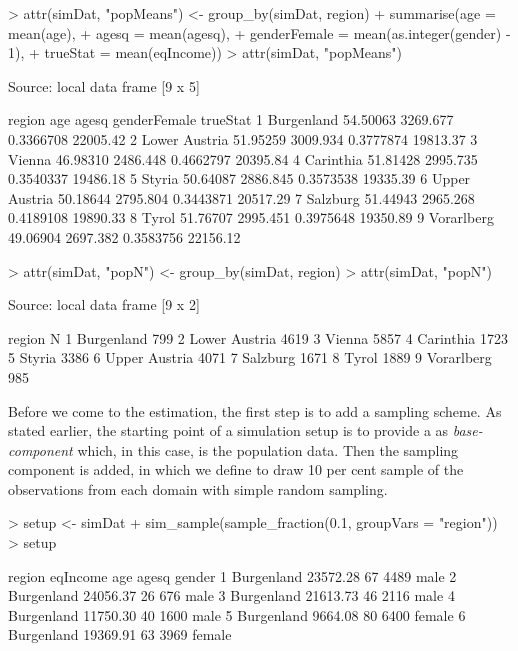 \documentclass[article]{ajs}
\begin{document}
\begin{Schunk}
\begin{Sinput}
> attr(simDat, "popMeans") <- group_by(simDat, region) %
+   summarise(age = mean(age),
+             agesq = mean(agesq),
+             genderFemale = mean(as.integer(gender) - 1),
+             trueStat = mean(eqIncome))
> attr(simDat, "popMeans")
\end{Sinput}
\begin{Soutput}
Source: local data frame [9 x 5]

         region      age    agesq genderFemale trueStat
1    Burgenland 54.50063 3269.677    0.3366708 22005.42
2 Lower Austria 51.95259 3009.934    0.3777874 19813.37
3        Vienna 46.98310 2486.448    0.4662797 20395.84
4     Carinthia 51.81428 2995.735    0.3540337 19486.18
5        Styria 50.64087 2886.845    0.3573538 19335.39
6 Upper Austria 50.18644 2795.804    0.3443871 20517.29
7      Salzburg 51.44943 2965.268    0.4189108 19890.33
8         Tyrol 51.76707 2995.451    0.3975648 19350.89
9    Vorarlberg 49.06904 2697.382    0.3583756 22156.12
\end{Soutput}
\begin{Sinput}
> attr(simDat, "popN") <- group_by(simDat, region) %
> attr(simDat, "popN")
\end{Sinput}
\begin{Soutput}
Source: local data frame [9 x 2]

         region    N
1    Burgenland  799
2 Lower Austria 4619
3        Vienna 5857
4     Carinthia 1723
5        Styria 3386
6 Upper Austria 4071
7      Salzburg 1671
8         Tyrol 1889
9    Vorarlberg  985
\end{Soutput}
\end{Schunk}

Before we come to the estimation, the first step is to add a sampling scheme. As stated earlier, the starting point of a simulation setup is to provide a  as \textit{base-component} which, in this case, is the population data. Then the sampling component is added, in which we define to draw 10 per cent sample of the observations from each domain with simple random sampling.

\begin{Schunk}
\begin{Sinput}
> setup <- simDat %
+   sim_sample(sample_fraction(0.1, groupVars = "region"))
> setup
\end{Sinput}
\begin{Soutput}
      region eqIncome age agesq gender
1 Burgenland 23572.28  67  4489   male
2 Burgenland 24056.37  26   676   male
3 Burgenland 21613.73  46  2116   male
4 Burgenland 11750.30  40  1600   male
5 Burgenland  9664.08  80  6400 female
6 Burgenland 19369.91  63  3969 female
\end{Soutput}
\end{Schunk}
\end{document}
